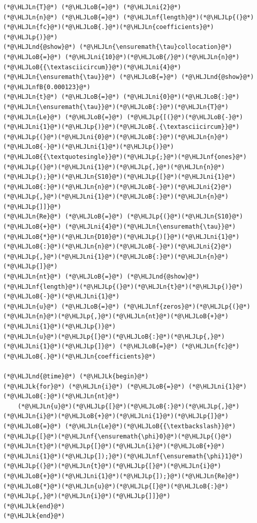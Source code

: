 \documentclass[12pt,a4paper]{article}
\newcommand{\HLJLk}[1]{\textcolor[RGB]{148,91,176}{\textbf{#1}}}
\newcommand{\HLJLn}[1]{#1}
\newcommand{\HLJLnd}[1]{\textcolor[RGB]{214,102,97}{#1}}
\newcommand{\HLJLnf}[1]{\textcolor[RGB]{66,102,213}{#1}}
\newcommand{\HLJLnfB}[1]{\textcolor[RGB]{59,151,46}{#1}}
\newcommand{\HLJLni}[1]{\textcolor[RGB]{59,151,46}{#1}}
\newcommand{\HLJLoB}[1]{\textcolor[RGB]{102,102,102}{\textbf{#1}}}
\newcommand{\HLJLp}[1]{#1}
\begin{document}
\begin{lstlisting}
(*@\HLJLn{T}@*) (*@\HLJLoB{=}@*) (*@\HLJLni{2}@*)
(*@\HLJLn{n}@*) (*@\HLJLoB{=}@*) (*@\HLJLnf{length}@*)(*@\HLJLp{(}@*)(*@\HLJLn{fc}@*)(*@\HLJLoB{.}@*)(*@\HLJLn{coefficients}@*)(*@\HLJLp{)}@*)
(*@\HLJLnd{@show}@*) (*@\HLJLn{\ensuremath{\tau}collocation}@*) (*@\HLJLoB{=}@*) (*@\HLJLni{10}@*)(*@\HLJLoB{/}@*)(*@\HLJLn{n}@*)(*@\HLJLoB{{\textasciicircum}}@*)(*@\HLJLni{4}@*)
(*@\HLJLn{\ensuremath{\tau}}@*) (*@\HLJLoB{=}@*) (*@\HLJLnd{@show}@*) (*@\HLJLnfB{0.000123}@*)
(*@\HLJLn{t}@*) (*@\HLJLoB{=}@*) (*@\HLJLni{0}@*)(*@\HLJLoB{:}@*)(*@\HLJLn{\ensuremath{\tau}}@*)(*@\HLJLoB{:}@*)(*@\HLJLn{T}@*)
(*@\HLJLn{Le}@*) (*@\HLJLoB{=}@*) (*@\HLJLp{[(}@*)(*@\HLJLoB{-}@*)(*@\HLJLni{1}@*)(*@\HLJLp{)}@*)(*@\HLJLoB{.{\textasciicircum}}@*)(*@\HLJLp{(}@*)(*@\HLJLni{0}@*)(*@\HLJLoB{:}@*)(*@\HLJLn{n}@*)(*@\HLJLoB{-}@*)(*@\HLJLni{1}@*)(*@\HLJLp{)}@*)(*@\HLJLoB{{\textquotesingle}}@*)(*@\HLJLp{;}@*)(*@\HLJLnf{ones}@*)(*@\HLJLp{(}@*)(*@\HLJLni{1}@*)(*@\HLJLp{,}@*)(*@\HLJLn{n}@*)(*@\HLJLp{);}@*)(*@\HLJLn{S10}@*)(*@\HLJLp{[}@*)(*@\HLJLni{1}@*)(*@\HLJLoB{:}@*)(*@\HLJLn{n}@*)(*@\HLJLoB{-}@*)(*@\HLJLni{2}@*)(*@\HLJLp{,}@*)(*@\HLJLni{1}@*)(*@\HLJLoB{:}@*)(*@\HLJLn{n}@*)(*@\HLJLp{]]}@*)
(*@\HLJLn{Re}@*) (*@\HLJLoB{=}@*) (*@\HLJLp{(}@*)(*@\HLJLn{S10}@*) (*@\HLJLoB{+}@*) (*@\HLJLni{4}@*)(*@\HLJLn{\ensuremath{\tau}}@*)(*@\HLJLoB{*}@*)(*@\HLJLn{D10}@*)(*@\HLJLp{)[}@*)(*@\HLJLni{1}@*)(*@\HLJLoB{:}@*)(*@\HLJLn{n}@*)(*@\HLJLoB{-}@*)(*@\HLJLni{2}@*)(*@\HLJLp{,}@*)(*@\HLJLni{1}@*)(*@\HLJLoB{:}@*)(*@\HLJLn{n}@*)(*@\HLJLp{]}@*)
(*@\HLJLn{nt}@*) (*@\HLJLoB{=}@*) (*@\HLJLnd{@show}@*) (*@\HLJLnf{length}@*)(*@\HLJLp{(}@*)(*@\HLJLn{t}@*)(*@\HLJLp{)}@*)(*@\HLJLoB{-}@*)(*@\HLJLni{1}@*)
(*@\HLJLn{u}@*) (*@\HLJLoB{=}@*) (*@\HLJLnf{zeros}@*)(*@\HLJLp{(}@*)(*@\HLJLn{n}@*)(*@\HLJLp{,}@*)(*@\HLJLn{nt}@*)(*@\HLJLoB{+}@*)(*@\HLJLni{1}@*)(*@\HLJLp{)}@*)
(*@\HLJLn{u}@*)(*@\HLJLp{[}@*)(*@\HLJLoB{:}@*)(*@\HLJLp{,}@*)(*@\HLJLni{1}@*)(*@\HLJLp{]}@*) (*@\HLJLoB{=}@*) (*@\HLJLn{fc}@*)(*@\HLJLoB{.}@*)(*@\HLJLn{coefficients}@*)

(*@\HLJLnd{@time}@*) (*@\HLJLk{begin}@*)
(*@\HLJLk{for}@*) (*@\HLJLn{i}@*) (*@\HLJLoB{=}@*) (*@\HLJLni{1}@*)(*@\HLJLoB{:}@*)(*@\HLJLn{nt}@*)
    (*@\HLJLn{u}@*)(*@\HLJLp{[}@*)(*@\HLJLoB{:}@*)(*@\HLJLp{,}@*)(*@\HLJLn{i}@*)(*@\HLJLoB{+}@*)(*@\HLJLni{1}@*)(*@\HLJLp{]}@*) (*@\HLJLoB{=}@*) (*@\HLJLn{Le}@*)(*@\HLJLoB{{\textbackslash}}@*)(*@\HLJLp{[}@*)(*@\HLJLnf{\ensuremath{\phi}0}@*)(*@\HLJLp{(}@*)(*@\HLJLn{t}@*)(*@\HLJLp{[}@*)(*@\HLJLn{i}@*)(*@\HLJLoB{+}@*)(*@\HLJLni{1}@*)(*@\HLJLp{]);}@*)(*@\HLJLnf{\ensuremath{\phi}1}@*)(*@\HLJLp{(}@*)(*@\HLJLn{t}@*)(*@\HLJLp{[}@*)(*@\HLJLn{i}@*)(*@\HLJLoB{+}@*)(*@\HLJLni{1}@*)(*@\HLJLp{]);}@*)(*@\HLJLn{Re}@*)(*@\HLJLoB{*}@*)(*@\HLJLn{u}@*)(*@\HLJLp{[}@*)(*@\HLJLoB{:}@*)(*@\HLJLp{,}@*)(*@\HLJLn{i}@*)(*@\HLJLp{]]}@*)
(*@\HLJLk{end}@*)
(*@\HLJLk{end}@*)
\end{lstlisting}
\end{document}
